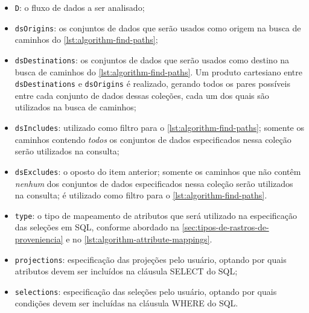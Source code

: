 \begin{itemize}
    \item \texttt{D}: o fluxo de dados a ser analisado;
    \item \texttt{dsOrigins}: os conjuntos de dados que serão usados como origem na busca de caminhos do \autoref{lst:algorithm-find-paths};
    \item \texttt{dsDestinations}: os conjuntos de dados que serão usados como destino na busca de caminhos do \autoref{lst:algorithm-find-paths}. Um produto cartesiano entre \texttt{dsDestinations} e \texttt{dsOrigins} é realizado, gerando todos os pares possíveis entre cada conjunto de dados dessas coleções, cada um dos quais são utilizados na busca de caminhos;
    \item \texttt{dsIncludes}: utilizado como filtro para o \autoref{lst:algorithm-find-paths}; somente os caminhos contendo \emph{todos} os conjuntos de dados especificados nessa coleção serão utilizados na consulta;
    \item \texttt{dsExcludes}: o oposto do item anterior; somente os caminhos que não contêm \emph{nenhum} dos conjuntos de dados especificados nessa coleção serão utilizados na consulta; é utilizado como filtro para o \autoref{lst:algorithm-find-paths}.
    \item \texttt{type}: o tipo de mapeamento de atributos que será utilizado na especificação das seleções em SQL, conforme abordado na \autoref{sec:tipos-de-rastros-de-proveniencia} e no \autoref{lst:algorithm-attribute-mappings}.
    \item \texttt{projections}: especificação das projeções pelo usuário, optando por quais atributos devem ser incluídos na cláusula \textsc{SELECT} do SQL;
    \item \texttt{selections}: especificação das seleções pelo usuário, optando por quais condições devem ser incluídas na cláusula \textsc{WHERE} do SQL.
\end{itemize}

